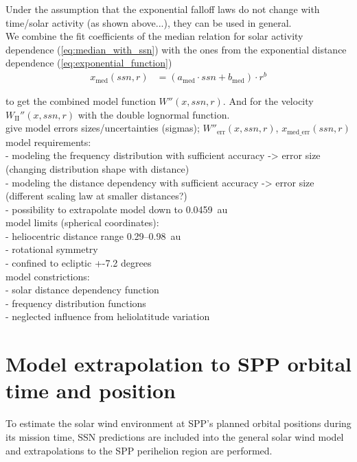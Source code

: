 Under the assumption that the exponential falloff laws do not change with time/solar activity (as shown above...), they can be used in general.\\

We combine the fit coefficients of the median relation for solar activity dependence (\ref{eq:median_with_ssn}) with the ones from the exponential distance dependence (\ref{eq:exponential_function})
\begin{align}
	x_\text{med}(ssn,r) &= (a_\text{med} \cdot ssn + b_\text{med}) \cdot r^b
\end{align}

to get the combined model function $W''(x,ssn,r)$. And for the velocity $W_\text{II}''(x,ssn,r)$ with the double lognormal function.\\

give model errors sizes/uncertainties (sigmas); $W''_\text{err}(x,ssn,r)$, $x_\text{med\_err}(ssn,r)$\\

model requirements:\\
- modeling the frequency distribution with sufficient accuracy -> error size (changing distribution shape with distance)\\
- modeling the distance dependency with sufficient accuracy -> error size (different scaling law at smaller distances?)\\
- possibility to extrapolate model down to 0.0459~au\\

model limits (spherical coordinates):\\
- heliocentric distance range 0.29--0.98~au\\
- rotational symmetry\\
- confined to ecliptic +-7.2 degrees\\
model constrictions:\\
- solar distance dependency function\\
- frequency distribution functions\\
- neglected influence from heliolatitude variation\\


\section{Model extrapolation to SPP orbital time and position}
To estimate the solar wind environment at SPP's planned orbital positions during its mission time, SSN predictions are included into the general solar wind model and extrapolations to the SPP perihelion region are performed.\\

